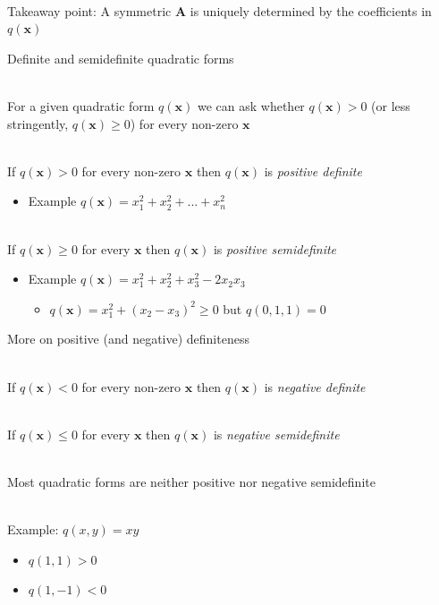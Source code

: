 \documentclass[10pt]{seminar}
\begin{document}
\begin{slide}
\ \\Takeaway point: A symmetric $\mathbf{A}$ is uniquely determined by the coefficients in  $q(\mathbf{x})$

\newslide

Definite and semidefinite quadratic forms

\ \\For a given quadratic form $q(\mathbf{x})$ we can ask whether $q(\mathbf{x})>0$ (or less stringently, $q(\mathbf{x})\geq 0$) for every non-zero $\mathbf{x}$

\ \\If  $q(\mathbf{x})>0$ for every non-zero $\mathbf{x}$ then $q(\mathbf{x})$ is \textit{positive definite}

\begin{itemize}
\item Example $q(\mathbf{x}) = x_1^2+x_2^2+...+x_n^2$
\end{itemize}

\ \\If  $q(\mathbf{x})\geq 0$ for every $\mathbf{x}$ then $q(\mathbf{x})$ is \textit{positive semidefinite}

\begin{itemize}
\item Example $q(\mathbf{x}) = x_1^2+x_2^2+x_3^2-2x_2x_3$
\begin{itemize}
\item $q(\mathbf{x}) = x_1^2+(x_2-x_3)^2 \geq 0$ but $q(0, 1, 1)=0$
\end{itemize}
\end{itemize}

\newslide
More on positive (and negative) definiteness

\ \\If  $q(\mathbf{x})<0$ for every non-zero $\mathbf{x}$ then $q(\mathbf{x})$ is \textit{negative definite}

\ \\If  $q(\mathbf{x})\leq 0$ for every $\mathbf{x}$ then $q(\mathbf{x})$ is \textit{negative semidefinite}

\ \\Most  quadratic forms are neither positive nor negative semidefinite

\ \\Example: $q(x, y)=xy$
\begin{itemize}
\item $q(1, 1)>0$
\item $q(1, -1)<0$
\end{itemize}


\end{slide}
\end{document}
